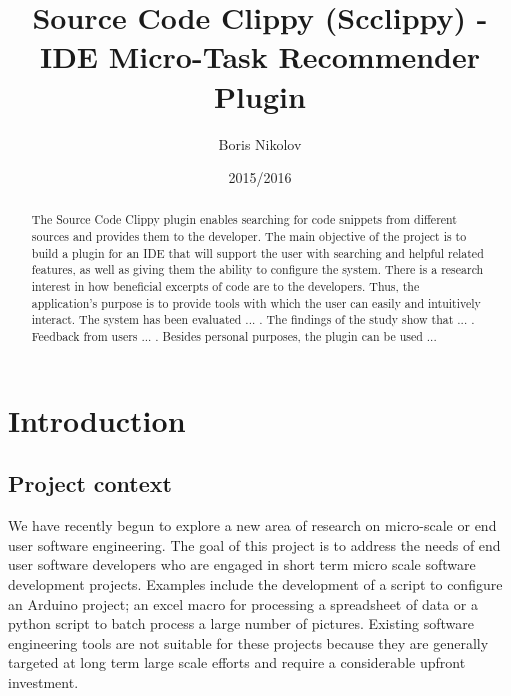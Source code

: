 \documentclass{l4proj}
\begin{document}
\title{Source Code Clippy (Scclippy) - IDE Micro-Task Recommender Plugin}
\author{Boris Nikolov}
\date{2015/2016}
\maketitle

\begin{abstract}
The Source Code Clippy plugin enables searching for code snippets from different sources and provides them to the developer. The main objective of the project is to build a plugin for an IDE that will support the user with searching and helpful related features, as well as giving them the ability to configure the system. There is a research interest in how beneficial excerpts of code are to the developers. Thus, the application's purpose is to provide tools with which the user can easily and intuitively interact. 
The system has been evaluated ... . The findings of the study show that ... . Feedback from users ... . Besides personal purposes, the plugin can be used ...
\end{abstract}

\educationalconsent
%
%
\tableofcontents

\chapter{Introduction}

\section{Project context}

We have recently begun to explore a new area of research on micro-scale or end user software engineering. The goal of this project is to address the needs of end user software developers who are engaged in short term micro scale software development projects. Examples include the development of a script to configure an Arduino project; an excel macro for processing a spreadsheet of data or a python script to batch process a large number of pictures. Existing software engineering tools are not suitable for these projects because they are generally targeted at long term large scale efforts and require a considerable upfront investment. 
\end{document}

